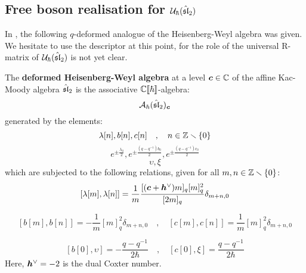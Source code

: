     \subsection{\texorpdfstring{Free boson realisation for $\calU_{\hbar}(\hat{\sl}_2)$}{}}
        In \cite[Section 7]{frenkel_reshetikhin_affine_QUEs_and_deformed_virasoro_and_finite_W_algebras}, the following $q$-deformed analogue of the Heisenberg-Weyl algebra was given. We hesitate to use the descriptor  at this point, for the role of the universal R-matrix of $\calU_{\hbar}(\hat{\sl}_2)$ is not yet clear.
        \begin{definition} \label{def: q_deformed_affine_sl_2_heisenberg_weyl_algebra}
            The \textbf{deformed Heisenberg-Weyl algebra} at a level $\level \in \bbC$ of the affine Kac-Moody algebra $\hat{\sl}_2$ is the associative $\bbC[\![\hbar]\!]$-algebra:
                $$\calA_{\hbar}(\hat{\sl}_2)_{\level}$$
            generated by the elements:
                $$\lambda[n], b[n], c[n] \quad, \quad n \in \Z \setminus \{0\}$$
                $$e^{\pm \frac{\lambda_0}{2}}, e^{\pm \frac{(q - q^{-1}) b_0}{2}}, e^{\pm \frac{(q - q^{-1}) c_0}{2}}$$
                $$\upsilon, \xi$$
            which are subjected to the following relations, given for all $m, n \in \Z \setminus \{0\}$:
                \begin{equation} \label{equation: q_deformed_affine_sl_2_heisenberg_weyl_lambda_commutators}
                    [ \lambda[m], \lambda[n] ] = \frac1m \frac{ [(\level + \dualcoxeter) m]_q [m]_q^2 }{ [2m]_q } \delta_{m + n, 0}
                \end{equation}
                
                \begin{equation} \label{equation: q_deformed_affine_sl_2_heisenberg_weyl_bc_commutators}
                    [ b[m], b[n] ] = -\frac1m [m]_q^2 \delta_{m + n, 0} \quad, \quad [ c[m], c[n] ] = \frac1m [m]_q^2 \delta_{m + n, 0}
                \end{equation}
                
                \begin{equation} \label{equation: q_deformed_affine_sl_2_heisenberg_weyl_upsilon_xi_commutators}
                    [ b[0], \upsilon ] = -\frac{q - q^{-1}}{2\hbar} \quad, \quad [ c[0], \xi ] = \frac{q - q^{-1}}{2\hbar}
                \end{equation}
            Here, $\dualcoxeter = -2$ is the dual Coxter number.
        \end{definition}
        
